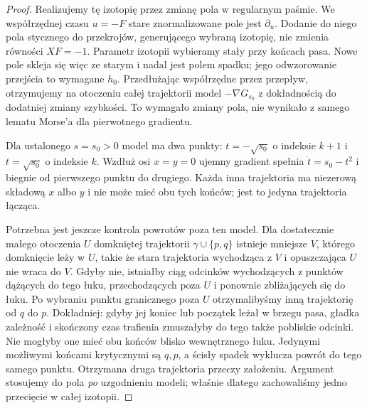 \begin{proof}
Realizujemy tę izotopię przez zmianę pola w regularnym paśmie.
We współrzędnej czasu $u=-F$ stare znormalizowane pole
jest $\partial_u$. Dodanie do niego pola stycznego
do przekrojów, generującego wybraną izotopię,
nie zmienia równości $XF=-1$.
Parametr izotopii wybieramy stały przy końcach pasa.
Nowe pole skleja się więc ze starym i nadal jest polem
spadku; jego odwzorowanie przejścia to wymagane $h_0$.
Przedłużając współrzędne przez przepływ, otrzymujemy
na otoczeniu całej trajektorii model $-\nabla G_{s_0}$
z dokładnością do dodatniej zmiany szybkości.
To wymagało zmiany pola, nie wynikało z samego
lematu Morse'a dla pierwotnego gradientu.

Dla ustalonego $s=s_0>0$ model ma dwa punkty:
$t=-\sqrt{s_0}$ o indeksie $k+1$
i $t=\sqrt{s_0}$ o indeksie $k$.
Wzdłuż osi $x=y=0$ ujemny gradient
spełnia $\dot t=s_0-t^2$ i biegnie
od pierwszego punktu do drugiego.
Każda inna trajektoria ma niezerową
składową $x$ albo $y$ i nie może mieć
obu tych końców; jest to jedyna
trajektoria łącząca.

Potrzebna jest jeszcze kontrola powrotów poza ten model.
Dla dostatecznie małego otoczenia $U$ domkniętej trajektorii
$\gamma\cup\{p,q\}$ istnieje mniejsze $V$, którego domknięcie
leży w $U$, takie że stara trajektoria wychodząca z $V$
i opuszczająca $U$ nie wraca do $V$.
Gdyby nie, istniałby ciąg odcinków wychodzących
z punktów dążących do tego łuku, przechodzących poza $U$
i ponownie zbliżających się do łuku.
Po wybraniu punktu granicznego poza $U$ otrzymalibyśmy
inną trajektorię od $q$ do $p$.
Dokładniej: gdyby jej koniec lub początek leżał
w brzegu pasa, gładka zależność i skończony czas
trafienia zmuszałyby do tego także pobliskie odcinki.
Nie mogłyby one mieć obu końców blisko wewnętrznego łuku.
Jedynymi możliwymi końcami krytycznymi są $q,p$,
a ścisły spadek wyklucza powrót do tego samego punktu.
Otrzymana druga trajektoria przeczy założeniu.
Argument stosujemy do pola \emph{po} uzgodnieniu modeli;
właśnie dlatego zachowaliśmy jedno przecięcie w całej izotopii.


\end{proof}
